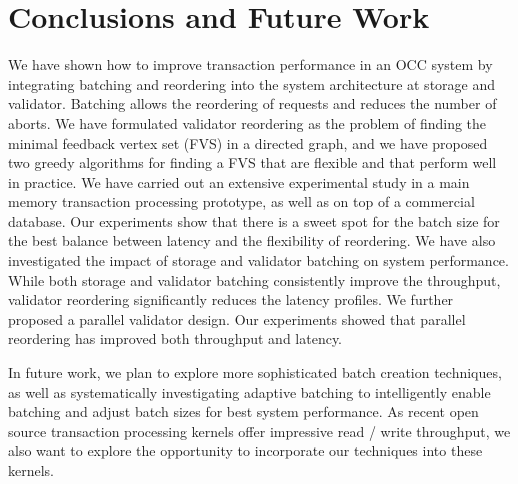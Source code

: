 \section{Conclusions and Future Work}\label{sec:conclusion}
We have shown how to improve transaction performance in an OCC system by integrating batching and reordering into the system architecture at storage and validator. Batching allows the reordering of requests and reduces the number of aborts. We have formulated validator reordering as the problem of finding the minimal feedback vertex set (FVS) in a directed graph, and we have proposed two greedy algorithms for finding a FVS that are flexible and that perform well in practice. We have carried out an extensive experimental study in a main memory transaction processing prototype, as well as on top of a commercial database. Our experiments show that there is a sweet spot for the batch size for the best balance between latency and the flexibility of reordering. We have also investigated the impact of storage and validator batching on system performance. While both storage and validator batching consistently improve the throughput, validator reordering significantly reduces the latency profiles. We further proposed a parallel validator design. Our experiments showed that parallel reordering has improved both throughput and latency.

In future work, we plan to explore more sophisticated batch creation techniques, as well as systematically investigating adaptive batching to intelligently enable batching and adjust batch sizes for best system performance. As recent open source transaction processing kernels offer impressive
read / write throughput, we also want to explore the opportunity to incorporate our techniques into these kernels.
